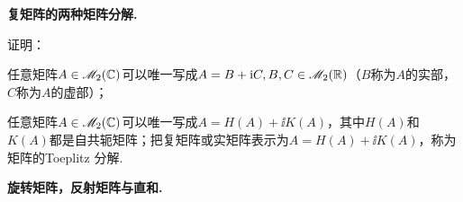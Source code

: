 \begin{problem}
  {\bfseries 复矩阵的两种矩阵分解.}

  证明：
  \begin{enum}
    \item 任意矩阵$A\in\mathscr M_2(\mathbb C)$可以唯一写成$A=B+\mathrm i C,B,C\in\mathscr M_2(\mathbb R)$（$B$称为$A$的{\kaishu 实部}，$C$称为$A$的{\kaishu 虚部}）；
    \item 任意矩阵$A\in\mathscr M_2(\mathbb C)$可以唯一写成$A=H(A)+\ii K(A)$，其中$H(A)$和$K(A)$都是自共轭矩阵；把复矩阵或实矩阵表示为$A=H(A)+\ii K(A)$，称为矩阵的{\kaishu Toeplitz 分解}\cite[p.227]{38}.
  \end{enum}
\end{problem}

\begin{mybox}
  \begin{problem}
    {\bfseries 旋转矩阵，反射矩阵与直和.}


\end{problem}
\end{mybox}
